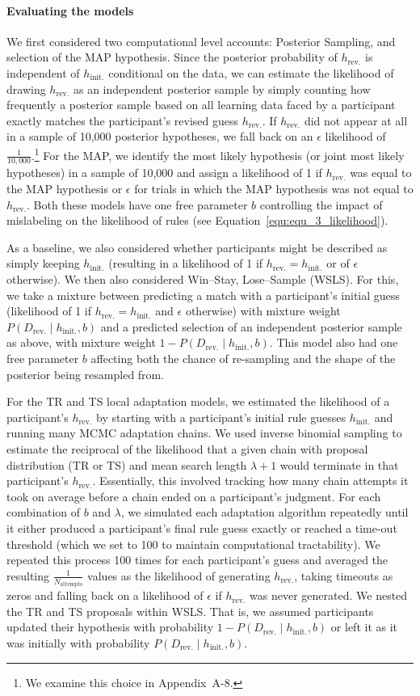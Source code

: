 \documentclass[doc,natbib,floatsintext]{apa7}
\newcommand{\dr}{D_{\mathrm{rev.}}}%
\newcommand{\hr}{h_{\mathrm{rev.}}}
\newcommand{\hi}{h_{\mathrm{init.}}}
\begin{document}
\paragraph{Evaluating the models}
We first considered two computational level accounts: Posterior Sampling, and selection of the MAP hypothesis. Since the posterior probability of $\hr$ is independent of $\hi$ conditional on the data, we can estimate the likelihood of drawing $\hr$ as an independent posterior sample by simply counting how frequently a posterior sample based on all learning data faced by a participant exactly matches the participant's revised guess $\hr$. If $\hr$ did not appear at all in a sample of 10,000 posterior hypotheses, we fall back on an $\epsilon$ likelihood of $\frac{1}{10,000}$.\footnote{We examine this choice in Appendix~A-8.} For the MAP, we identify the most likely hypothesis (or joint most likely hypotheses) in a sample of 10,000 and assign a likelihood of 1 if $\hr$ was equal to the MAP hypothesis or $\epsilon$ for trials in which the MAP hypothesis was not equal to $\hr$. Both these models have one free parameter $b$ controlling the impact of mislabeling on the likelihood of rules (see Equation~\ref{equ:equ_3_likelihood}).

As a baseline, we also considered whether participants might be described as simply keeping $\hi$ (resulting in a likelihood of 1 if $\hr=\hi$ or of $\epsilon$ otherwise). 
We then also considered Win--Stay, Lose--Sample (WSLS). For this, we take a mixture between predicting a match with a participant's initial guess (likelihood of 1 if $\hr=\hi$ and $\epsilon$ otherwise) with mixture weight $P(\dr\mid\hi, b)$ and a predicted selection of an independent posterior sample as above, with mixture weight $1-P(\dr\mid\hi, b)$. This model also had one free parameter $b$ affecting both the chance of re-sampling and the shape of the posterior being resampled from.

For the TR and TS local adaptation models, we estimated the likelihood of a participant's $\hr$ by starting with a participant's initial rule guesses $\hi$ and running many MCMC adaptation chains. We used inverse binomial sampling \citep{van2020unbiased} to estimate the reciprocal of the likelihood that a given chain with proposal distribution (TR or TS) and mean search length $\lambda+1$ would terminate in that participant's $\hr$. Essentially, this involved tracking how many chain attempts it took on average before a chain ended on a participant's judgment. 
For each combination of $b$ and $\lambda$, we simulated each adaptation algorithm repeatedly until it either produced a participant's final rule guess exactly or reached a time-out threshold (which we set to 100 to maintain computational tractability). We repeated this process 100 times for each participant's guess and averaged the resulting $\frac{1}{N_{\mathrm{attempts}}}$ values as the likelihood of generating $\hr$, taking timeouts as zeros and falling back on a likelihood of $\epsilon$ if $\hr$ was never generated. We nested the TR and TS proposals within WSLS. That is, we assumed participants updated their hypothesis with probability $1-P(\dr\mid\hi, b)$ or left it as it was initially with probability $P(\dr\mid\hi, b)$.
\end{document}
